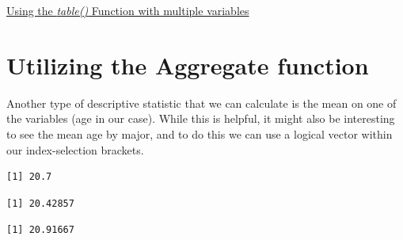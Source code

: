 \documentclass[
  letterpaper,
  DIV=11,
  numbers=noendperiod]{scrreprt}
\newenvironment{Shaded}{\begin{snugshade}}{\end{snugshade}}
\newcommand{\FunctionTok}[1]{\textcolor[rgb]{0.28,0.35,0.67}{#1}}
\newcommand{\NormalTok}[1]{\textcolor[rgb]{0.00,0.23,0.31}{#1}}
\newcommand{\SpecialCharTok}[1]{\textcolor[rgb]{0.37,0.37,0.37}{#1}}
\newcommand{\StringTok}[1]{\textcolor[rgb]{0.13,0.47,0.30}{#1}}
\begin{document}
\begin{watch}{}{}
    \href{https://youtu.be/Oq4GZnTAHNk}{Using the \textit{table()} Function with multiple variables}
\end{watch}

\section{Utilizing the Aggregate
function}\label{utilizing-the-aggregate-function}

Another type of descriptive statistic that we can calculate is the mean
on one of the variables (age in our case). While this is helpful, it
might also be interesting to see the mean age by major, and to do this
we can use a logical vector within our index-selection brackets.

\begin{Shaded}
\end{Shaded}

\begin{verbatim}
[1] 20.7
\end{verbatim}

\begin{Shaded}
\end{Shaded}

\begin{verbatim}
[1] 20.42857
\end{verbatim}

\begin{Shaded}
\end{Shaded}

\begin{verbatim}
[1] 20.91667
\end{verbatim}
\end{document}
